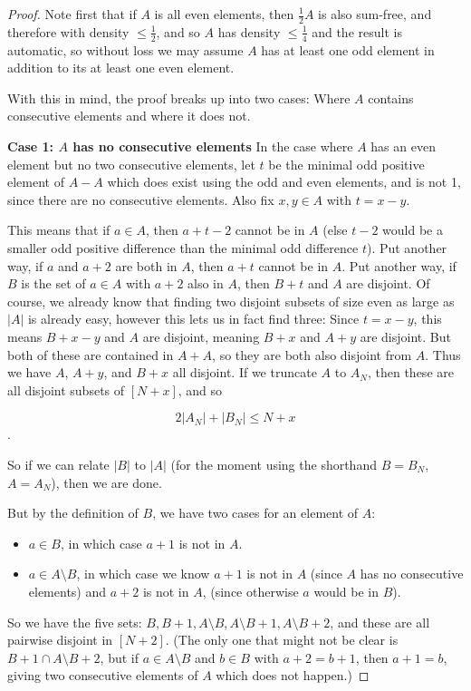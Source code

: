 \documentclass{report}
\theoremstyle{remark}
\numberwithin{equation}{section}
\begin{document}
\begin{proof}
Note first that if $A$ is all even elements, then $\frac12 A$ is
also sum-free, and therefore with density $\leq \frac12$, and so $A$
has density $\leq \frac14$ and the result is automatic, so without
loss we may assume $A$ has at least one odd element in addition to its
at least one even element.  

With this in mind, the proof breaks up into two cases: Where $A$
contains consecutive elements and where it does not.

\textbf{Case 1: $A$ has no consecutive elements} In the case where $A$
has an even element but no two consecutive elements, let $t$ be the
minimal odd positive element of $A-A$ which does exist using the odd
and even elements, and is not 1, since there are no consecutive
elements.  Also fix $x, y \in A$ with $t = x-y$.

This means that if $a \in A$, then $a+t-2$ cannot be in $A$ (else
$t-2$ would be a smaller odd positive difference than the minimal odd
difference $t$).  Put another way, if $a$ and $a+2$ are both in $A$,
then $a+t$ cannot be in $A$.  Put another way, if $B$ is the set of
$a \in A$ with $a+2$ also in $A$, then $B+t$ and $A$ are disjoint.  Of
course, we already know that finding two disjoint subsets of size even
as large as $|A|$ is already easy, however this lets us in fact find
three: Since $t=x-y$, this means $B+x-y$ and $A$ are disjoint, meaning
$B+x$ and $A+y$ are disjoint.  But both of these are contained in
$A+A$, so they are both also disjoint from $A$.  Thus we have $A$,
$A+y$, and $B+x$ all disjoint.  If we truncate $A$ to $A_N$, then
these are all disjoint subsets of $[N+x]$, and so

\[2|A_N|+|B_N| \leq N+x\].

So if we can relate $|B|$ to $|A|$ (for the moment using the shorthand
$B = B_N$, $A = A_N$), then we are done.  

But by the definition of $B$, we have two cases for an element of $A$: 
\begin{itemize}
\item $a \in B$, in which case $a+1$ is not in $A$.  
\item $a \in A\setminus B$, in which case we know $a+1$ is not in $A$
  (since $A$ has no consecutive elements) and $a+2$ is not in $A$,
  (since otherwise $a$ would be in $B$).
\end{itemize}

So we have the five sets:
$B, B+1, A\setminus B, A\setminus B + 1, A\setminus B + 2$, and these
are all pairwise disjoint in $[N+2]$.  (The only one that might not be
clear is $B+1 \cap A \setminus B + 2$, but if $a \in A\setminus B$ and
$b \in B$ with $a+2=b+1$, then $a + 1 = b$, giving two consecutive
elements of $A$ which does not happen.)


\end{proof}
\end{document}
